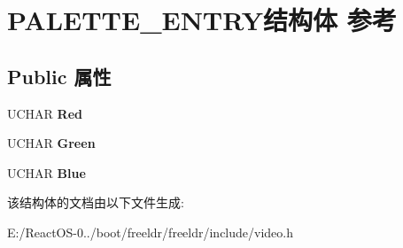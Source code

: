 \hypertarget{struct_p_a_l_e_t_t_e___e_n_t_r_y}{}\section{P\+A\+L\+E\+T\+T\+E\+\_\+\+E\+N\+T\+R\+Y结构体 参考}
\label{struct_p_a_l_e_t_t_e___e_n_t_r_y}
\subsection*{Public 属性}
\begin{DoxyCompactItemize}
\item 
\mbox{\label{struct_p_a_l_e_t_t_e___e_n_t_r_y_a7bfcda6ff1b3f4d496f064cefa8e4677}} 
U\+C\+H\+AR {\bfseries Red}
\item 
\mbox{\label{struct_p_a_l_e_t_t_e___e_n_t_r_y_a84cb0f866d66d0ac01c425c9440b454f}} 
U\+C\+H\+AR {\bfseries Green}
\item 
\mbox{\label{struct_p_a_l_e_t_t_e___e_n_t_r_y_a621bbee3dfd5789c85e7fdcaf55e2559}} 
U\+C\+H\+AR {\bfseries Blue}
\end{DoxyCompactItemize}


该结构体的文档由以下文件生成\+:\begin{DoxyCompactItemize}
\item 
E\+:/\+React\+O\+S-\/0../boot/freeldr/freeldr/include/video.\+h\end{DoxyCompactItemize}
